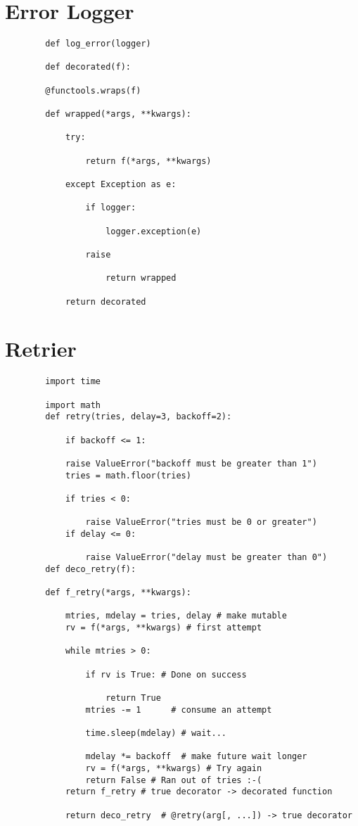 \documentclass{article}
\begin{document}
	\section {Error Logger}
	\begin{lstlisting}
		def log_error(logger)
		
		def decorated(f):
		
		@functools.wraps(f)
		
		def wrapped(*args, **kwargs):
		
			try:
		
				return f(*args, **kwargs)
		
			except Exception as e:
		
				if logger:
		
					logger.exception(e)
		
				raise
		
					return wrapped
		
			return decorated
	\end{lstlisting}
	
	\section {Retrier}
	\begin{lstlisting}
		import time
		
		import math
		def retry(tries, delay=3, backoff=2):
		
			if backoff <= 1:
			
			raise ValueError("backoff must be greater than 1")
			tries = math.floor(tries)
			
			if tries < 0:
			
				raise ValueError("tries must be 0 or greater")
			if delay <= 0:
			
				raise ValueError("delay must be greater than 0")
		def deco_retry(f):
			
		def f_retry(*args, **kwargs):
			
			mtries, mdelay = tries, delay # make mutable
			rv = f(*args, **kwargs) # first attempt
			
			while mtries > 0:
			
				if rv is True: # Done on success
			
					return True
				mtries -= 1      # consume an attempt
			
				time.sleep(mdelay) # wait...
				
				mdelay *= backoff  # make future wait longer
				rv = f(*args, **kwargs) # Try again
				return False # Ran out of tries :-(
			return f_retry # true decorator -> decorated function
			
			return deco_retry  # @retry(arg[, ...]) -> true decorator
	\end{lstlisting}
	
\end{document}
